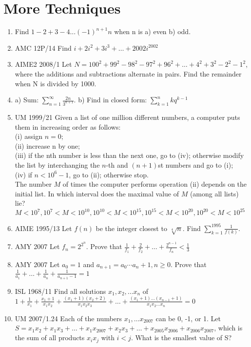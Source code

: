 \documentclass{article}
\begin{document}
\section{More Techniques}
\begin{enumerate}
\item Find $1-2+3-4... (-1)^{n+1}n$ when n is a) even b) odd.
\item AMC 12P/14 Find $i + 2i^2+ 3i^3 + \ldots + 2002i^{2002}$
\item AIME2 2008/1 Let $N= 100^2 +99^2-98^2-97^2+96^2+ \ldots +4^2+3^2-2^2-1^2$, where the additions and subtractions alternate in pairs. Find the remainder when N is divided by 1000.
\item a) Sum: $\sum_{n=1}^{\infty} \frac{2n}{3^{n+1}}$. b) Find in closed form: $\sum_{k=1}^{n} kq^{k-1}$
\item UM 1999/21 Given a list of one million different numbers, a computer puts them in
increasing order as follows: 
 \\(i) assign $n=0$; 
 \\(ii) increase n by one; 
 \\(iii) if the nth number is less than the next one, go to (iv); otherwise modify the list
       by interchanging the $n$-th and $(n+1)$st numbers and go to (i);
 \\(iv) if $n<10^6-1$, go to (ii); otherwise stop.
\\The number $M$ of times the computer performs operation (ii) depends on the initial list. 
In which interval does the maximal value of $M$ (among all lists) lie?
$M<10^7, 10^7<M<10^{10}, 10^{10}<M<10^{15}, 10^{15}<M<10^{20}, 10^{20}<M<10^{25}$
\item AIME 1995/13 Let $f(n)$ be the integer closest to $\sqrt[4]{n}$. Find $\sum_{k=1}^{1995} \frac{1}{f(k)}$.
\item AMY 2007 Let $f_n=2^{2^n}$. Prove that $\frac{1}{f_1} + \frac{2}{f_2} + \ldots + \frac{2^{n-1}}{f_n} <\frac{1}{3}$
\item AMY 2007 Let $a_0=1$ and $a_{n+1}=a_0 \cdots a_n +1, n \geq 0$. Prove that $\frac{1}{a_1}+\ldots +\frac{1}{a_n}+\frac{1}{a_{n+1}-1}=1$
\item ISL 1968/11 Find all solutions ${x_1, x_2, \ldots x_n}$ of $1+\frac{1}{x_1}+\frac{x_1+1}{x_1 x_2}+\frac{(x_1+1)(x_2+2)}{x_1 x_2 x_3} + \ldots + \frac{(x_1+1) \ldots (x_{n-1}+1)}{x_1 x_2 \ldots x_n}=0$
\item UM 2007/1.24 Each of the numbers $x_1, \ldots x_{2007}$ can be 0, -1, or 1. Let $S= x_1x_2+x_1x_3+\ldots +x_1x_{2007}+x_2x_3+\ldots+x_{2005}x_{2006}+ x_{2006}x_{2007}$, which is the sum of all products $x_ix_j$ with $i<j$. What is the smallest value of S?

\end{enumerate}
\end{document}
